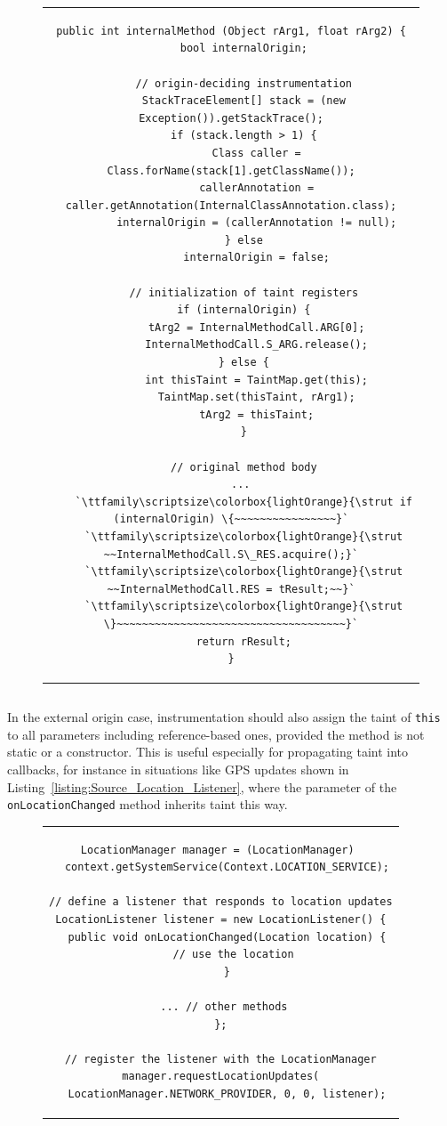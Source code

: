 \documentclass[12pt,twoside,notitlepage]{report}
\newcommand{\highlight}[1]{\colorbox{lightOrange}{\strut #1}}
\newcommand{\lsthl}[1] {\ttfamily\scriptsize\highlight{#1}}
\begin{document}
\begin{figure}
	\centering
	\begin{tabular}{c}
	\begin{lstlisting}
public int internalMethod (Object rArg1, float rArg2) {
	bool internalOrigin;

	// origin-deciding instrumentation
	StackTraceElement[] stack = (new Exception()).getStackTrace();
	if (stack.length > 1) {
		Class caller = Class.forName(stack[1].getClassName());
		callerAnnotation = caller.getAnnotation(InternalClassAnnotation.class);
		internalOrigin = (callerAnnotation != null);
	} else
		internalOrigin = false;

	// initialization of taint registers
	if (internalOrigin) {
		tArg2 = InternalMethodCall.ARG[0];
		InternalMethodCall.S_ARG.release();
	} else {
		int thisTaint = TaintMap.get(this);
		TaintMap.set(thisTaint, rArg1);
		tArg2 = thisTaint;
	}

	// original method body
	... 
	`\lsthl{if (internalOrigin) \{~~~~~~~~~~~~~~~~}`
	`\lsthl{~~InternalMethodCall.S\_RES.acquire();}`
	`\lsthl{~~InternalMethodCall.RES = tResult;~~}`
	`\lsthl{\}~~~~~~~~~~~~~~~~~~~~~~~~~~~~~~~~~~~~}`
	return rResult;
}
	\end{lstlisting}
	\end{tabular}
	\begin{lstlisting}[caption={Instrumentation of internal methods},
	                   label={listing:TaintPropagation_InternalMethods}]
	\end{lstlisting}
\end{figure}

In the external origin case, instrumentation should also assign the taint of \verb$this$ to all parameters including reference-based ones, provided the method is not static or a constructor. This is useful especially for propagating taint into callbacks, for instance in situations like GPS updates shown in Listing~\ref{listing:Source_Location_Listener}, where the parameter of the \verb$onLocationChanged$ method inherits taint this way.

\begin{figure}
	\centering
	\begin{tabular}{c}
	\begin{lstlisting}
LocationManager manager = (LocationManager) 
  context.getSystemService(Context.LOCATION_SERVICE);

// define a listener that responds to location updates
LocationListener listener = new LocationListener() {
  public void onLocationChanged(Location location) {
    // use the location
  }

  ... // other methods 
};

// register the listener with the LocationManager
manager.requestLocationUpdates(
  LocationManager.NETWORK_PROVIDER, 0, 0, listener);
	\end{lstlisting}
	\end{tabular}
	\begin{lstlisting}[caption={Example of a location-updating callback class},
	                   label={listing:Source_Location_Listener}]
	\end{lstlisting}
\end{figure}
\end{document}
